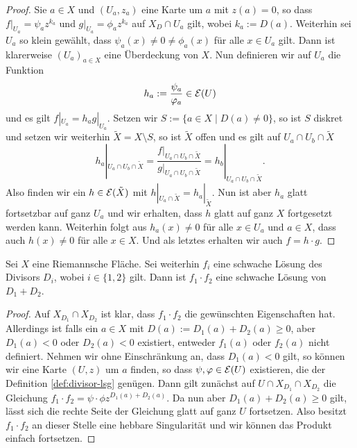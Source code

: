 \begin{proof}
  Sie $a \in X$ und $(U_a, z_a)$ eine Karte um $a$ mit $z(a) = 0$, so
  dass $f|_{U_a} = \psi_a z^{k_a}$ und $g|_{U_a} = \phi_a
  z^{k_a}$ auf $X_D \cap U_a$ gilt, wobei $k_a := D(a)$. Weiterhin sei
  $U_a$ so klein gewählt, dass $\psi_a(x) \neq 0 \neq \phi_a(x)$ für
  alle $x \in U_a$ gilt. Dann ist klarerweise $(U_a)_{a \in X}$ eine
  Überdeckung von $X$. Nun definieren wir auf $U_a$ die Funktion
  \[
  h_a := \frac{\psi_a}{\varphi_a} \in \mathcal{E}(U)
  \]
  und es gilt $f|_{U_a} = h_a g|_{U_a}$. Setzen wir $S := \{ a \in X
  \mid D(a) \neq 0\}$, so ist $S$ diskret und setzen wir weiterhin
  $\tilde X = X \setminus S$, so ist $\tilde X$ offen und es gilt auf $U_a \cap U_b \cap
  \tilde X$
  \[
  h_a|_{U_a \cap U_b \cap \tilde X} = \frac{f|_{U_a \cap U_b \cap
      \tilde X}}{g|_{U_a \cap U_b \cap \tilde X}} = h_b|_{U_a \cap U_b
    \cap \tilde X}.
  \]
  Also finden wir ein $h \in \mathcal{E}(\tilde X)$ mit $h|_{U_a \cap \tilde
    X} = h_a|_{\tilde X}$. Nun ist aber $h_a$ glatt fortsetzbar auf
  ganz $U_a$ und wir erhalten, dass $h$ glatt auf ganz $X$ fortgesetzt
  werden kann. Weiterhin folgt aus $h_a(x) \neq 0$ für alle $x \in
  U_a$ und $a \in X$, dass auch $h(x) \neq 0$ für alle $x \in X$. Und
  als letztes erhalten wir auch $f = h \cdot g$.
\end{proof}

\begin{lemma}
  \label{lemma:lsg-produkt}
  Sei $X$ eine Riemannsche Fläche. Sei weiterhin $f_i$ 
  eine schwache Lösung des Divisors $D_i$, wobei $i \in \{1,2\}$ gilt. Dann ist
  $f_1 \cdot f_2$ eine schwache Lösung von $D_1 + D_2$.
\end{lemma}

\begin{proof}
  Auf $X_{D_1} \cap X_{D_2}$ ist klar, dass $f_1 \cdot f_2$ die
  gewünschten Eigenschaften hat. Allerdings ist falls ein $a \in
  X$ mit $D(a) := D_1(a) +
  D_2(a) \geq 0$, aber $D_1(a) < 0$ oder $D_2(a) < 0$ existiert, entweder $f_1(a)$ oder
  $f_2(a)$ nicht definiert. Nehmen wir ohne Einschränkung an, dass
  $D_1(a) < 0$ gilt, so können wir eine Karte $(U,z)$ um $a$ finden,
  so dass $\psi, \varphi \in \mathcal{E}(U)$ existieren, die der Definition
  \ref{def:divisor-lsg} genügen. Dann gilt zunächst auf $U \cap
  X_{D_1} \cap X_{D_2}$ die Gleichung $f_1 \cdot f_2 = \psi \cdot \phi
  z^{D_1(a) + D_2(a)}$. Da nun aber $D_1(a) + D_2(a) \geq 0$ gilt,
  lässt sich die rechte Seite der Gleichung glatt auf ganz $U$
  fortsetzen. Also besitzt $f_1 \cdot f_2$ an dieser Stelle eine
  hebbare Singularität und wir können das Produkt einfach fortsetzen.
\end{proof}

